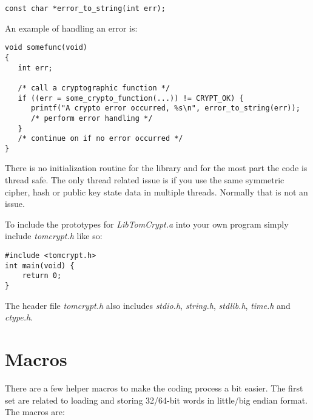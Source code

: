 \documentclass[synpaper]{book}
\newcommand{\mysection}[1]    %
	{                   %
	\section{#1}
   \markboth{\textsf{www.libtom.org}}{\thesection ~ {#1}}
	}
\begin{document}
\begin{verbatim}
const char *error_to_string(int err);
\end{verbatim}

An example of handling an error is:
\begin{small}
\begin{verbatim}
void somefunc(void)
{
   int err;
   
   /* call a cryptographic function */
   if ((err = some_crypto_function(...)) != CRYPT_OK) {
      printf("A crypto error occurred, %s\n", error_to_string(err));
      /* perform error handling */
   }
   /* continue on if no error occurred */
}
\end{verbatim}
\end{small}

There is no initialization routine for the library and for the most part the code is thread safe.  The only thread
related issue is if you use the same symmetric cipher, hash or public key state data in multiple threads.  Normally
that is not an issue.

To include the prototypes for \textit{LibTomCrypt.a} into your own program simply include \textit{tomcrypt.h} like so:
\begin{small}
\begin{verbatim}
#include <tomcrypt.h>
int main(void) {
    return 0;
}
\end{verbatim}
\end{small}

The header file \textit{tomcrypt.h} also includes \textit{stdio.h}, \textit{string.h}, \textit{stdlib.h}, \textit{time.h} and \textit{ctype.h}.

\mysection{Macros}

There are a few helper macros to make the coding process a bit easier.  The first set are related to loading and storing
32/64-bit words in little/big endian format.  The macros are:
\end{document}
